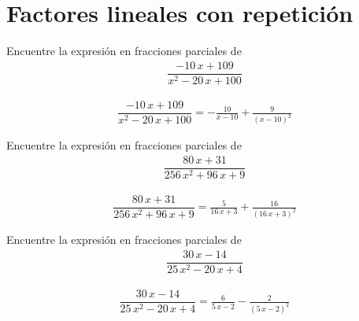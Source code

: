\section{Factores lineales con repetición}

{}
	\begin{problema}
		Encuentre la expresión en fracciones parciales de
		\begin{align}
			\dfrac{-10 \, x + 109}{x^{2} - 20 \, x + 100}
		\end{align}
	\end{problema}
	
	\begin{align*}
		\dfrac{-10 \, x + 109}{x^{2} - 20 \, x + 100}= -\frac{10}{x - 10} + \frac{9}{{\left(x - 10\right)}^{2}}
	\end{align*}
	

{}
	\begin{problema}
		Encuentre la expresión en fracciones parciales de
		\begin{align}
			\dfrac{80 \, x + 31}{256 \, x^{2} + 96 \, x + 9}
		\end{align}
	\end{problema}
	
	\begin{align*}
		\dfrac{80 \, x + 31}{256 \, x^{2} + 96 \, x + 9}= \frac{5}{16 \, x + 3} + \frac{16}{{\left(16 \, x + 3\right)}^{2}}
	\end{align*}
	

{}
	\begin{problema}
		Encuentre la expresión en fracciones parciales de
		\begin{align}
			\dfrac{30 \, x - 14}{25 \, x^{2} - 20 \, x + 4}
		\end{align}
	\end{problema}
	
	\begin{align*}
		\dfrac{30 \, x - 14}{25 \, x^{2} - 20 \, x + 4}= \frac{6}{5 \, x - 2} - \frac{2}{{\left(5 \, x - 2\right)}^{2}}
	\end{align*}
	

